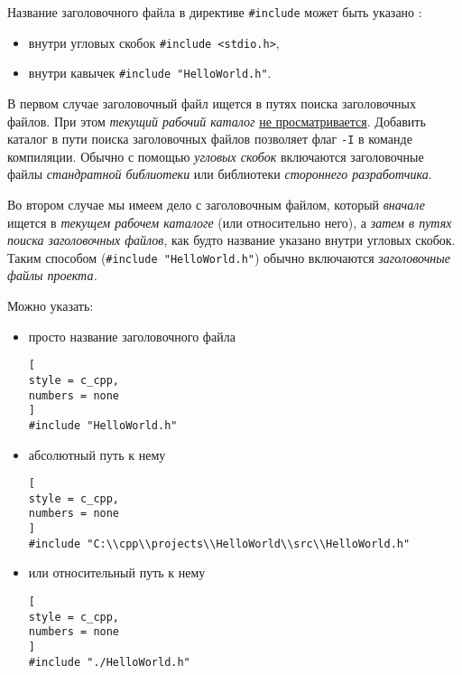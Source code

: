 \documentclass[%
	11pt,
	a4paper,
	utf8,
		]{article}
\begin{document}
Название заголовочного файла в директиве \verb|#include| может быть указано \cite[]{prokhorenok-prog-c:2020}:
\begin{itemize}
	\item внутри угловых скобок \verb|#include <stdio.h>|,
	
	\item внутри кавычек \verb|#include "HelloWorld.h"|.
\end{itemize}

В первом случае заголовочный файл ищется в путях поиска заголовочных файлов. {При этом \emph{текущий рабочий каталог} \underline{не просматривается}}. Добавить каталог в пути поиска заголовочных файлов позволяет флаг \verb|-I| в команде компиляции. {\color{blue}Обычно с помощью \emph{угловых скобок} включаются заголовочные файлы \emph{стандратной библиотеки} или библиотеки \emph{стороннего разработчика}.}

Во втором случае мы имеем дело с заголовочным файлом, который \emph{вначале} ищется в \emph{текущем рабочем каталоге} (или относительно него), а \emph{затем в путях поиска заголовочных файлов}, как будто название указано внутри угловых скобок. {\color{blue}Таким способом (\verb|#include "HelloWorld.h"|) обычно включаются \emph{заголовочные файлы проекта.}}

Можно указать:
\begin{itemize}
	\item просто название заголовочного файла
\begin{lstlisting}[
style = c_cpp,
numbers = none
]
#include "HelloWorld.h"
\end{lstlisting}

\item абсолютный путь к нему
\begin{lstlisting}[
style = c_cpp,
numbers = none
]
#include "C:\\cpp\\projects\\HelloWorld\\src\\HelloWorld.h"
\end{lstlisting}

\item или относительный путь к нему
\begin{lstlisting}[
style = c_cpp,
numbers = none
]
#include "./HelloWorld.h"
\end{lstlisting}
	
\end{itemize}
\end{document}
